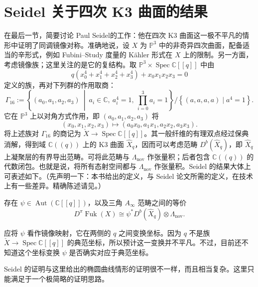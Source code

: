 \section{Seidel 关于四次 K3 曲面的结果}\label{sec:8.5}
\setcounter{equation}{26}

在最后一节，简要讨论 Paul Seidel的工作：他在四次 K3 曲面这一极不平凡的情形中证明了同调镜像对称。准确地说，设 $X$ 为 $\mathbb P^3$ 中的非奇异四次曲面，配备适当的辛形式，例如 Fubini--Study 度量的 Kähler 形式在 $X$ 上的限制。另一方面，考虑镜像族；这里关注的是它的复结构。取 $\mathbb P^3\times\operatorname{Spec}\mathbb C[[q]]$ 中由
\begin{equation}\label{eq:8.27}
q(x_0^4+x_1^4+x_2^4+x_3^4)+x_0x_1x_2x_3=0
\end{equation}
定义的族，再对下列群的作用取商：
\[
\Gamma_{16}:=
\left\{(a_0,a_1,a_2,a_3)\ \middle|\
 a_i\in\mathbb C,\ a_i^4=1,\ \prod_{i=0}^3a_i=1\right\}
\big/\left\{(a,a,a,a)\mid a^4=1\right\}.
\]
它在 $\mathbb P^3$ 上以对角方式作用，即 $(a_0,a_1,a_2,a_3)$ 将
\[
(x_0,x_1,x_2,x_3)\longmapsto
(a_0x_0,a_1x_1,a_2x_2,a_3x_3).
\]
将上述族对 $\Gamma_{16}$ 的商记为 $\check X\to\operatorname{Spec}\mathbb C[[q]]$。其一般纤维的有理双点经过保典消解，得到域 $\mathbb C((q))$ 上的 K3 曲面 $\widehat X_q$，因而可以考虑范畴 $D^b(\widehat X_q)$，即 $\widehat X_q$ 上凝聚层的有界导出范畴。可将此范畴与 $\Lambda_{\mathrm{nov}}$ 作张量积；后者包含 $\mathbb C((q))$ 的代数闭包。也就是说，将所有态射空间都与 $\Lambda_{\mathrm{nov}}$ 作张量积。Seidel 的结果大体上可表述如下。（先声明一下：本书给出的定义，与 Seidel 论文所需的定义，在技术上有一些差异。精确陈述请见。）

\begin{theorem}\label{thm:8.33}
存在 $\psi\in\operatorname{Aut}(\mathbb C[[q]])$，以及三角 $A_\infty$ 范畴之间的等价
\[
D^\pi\operatorname{Fuk}(X)
\cong\psi^*D^b(\widehat X_q)\otimes\Lambda_{\mathrm{nov}}.
\]
\end{theorem}

应将 $\psi$ 看作镜像映射，它在两侧的 $q$ 之间变换坐标。因为 $q$ 不是族 $\check X\to\operatorname{Spec}\mathbb C[[q]]$ 的典范坐标，所以预计这一变换并不平凡。不过，目前还不知道这个坐标变换 $\psi$ 是否确实对应于典范坐标。

Seidel 的证明与这里给出的椭圆曲线情形的证明很不一样，而且相当复杂。这里只能满足于一个极简略的证明思路。

